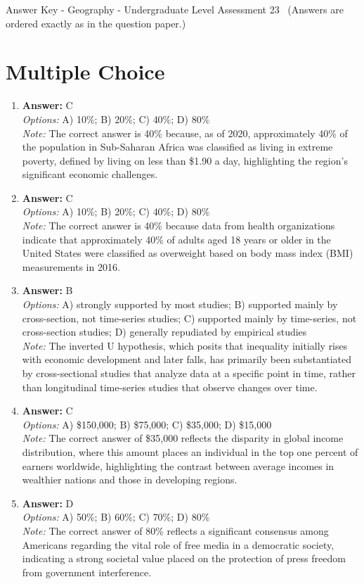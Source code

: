 \documentclass[12pt]{article}
\begin{document}
\begin{center}
Answer Key - Geography - Undergraduate Level Assessment 23 \
\small (Answers are ordered exactly as in the question paper.)
\end{center}

\section*{Multiple Choice}
\begin{enumerate}[label=\arabic*.]
\item \textbf{Answer:} C
\\ \textit{Options:} A) 10\%; B) 20\%; C) 40\%; D) 80\%
\\ \textit{Note:} The correct answer is 40\% because, as of 2020, approximately 40\% of the population in Sub-Saharan Africa was classified as living in extreme poverty, defined by living on less than \$1.90 a day, highlighting the region's significant economic challenges.
\item \textbf{Answer:} C
\\ \textit{Options:} A) 10\%; B) 20\%; C) 40\%; D) 80\%
\\ \textit{Note:} The correct answer is 40\% because data from health organizations indicate that approximately 40\% of adults aged 18 years or older in the United States were classified as overweight based on body mass index (BMI) measurements in 2016.
\item \textbf{Answer:} B
\\ \textit{Options:} A) strongly supported by most studies; B) supported mainly by cross-section, not time-series studies; C) supported mainly by time-series, not cross-section studies; D) generally repudiated by empirical studies
\\ \textit{Note:} The inverted U hypothesis, which posits that inequality initially rises with economic development and later falls, has primarily been substantiated by cross-sectional studies that analyze data at a specific point in time, rather than longitudinal time-series studies that observe changes over time.
\item \textbf{Answer:} C
\\ \textit{Options:} A) \$150,000; B) \$75,000; C) \$35,000; D) \$15,000
\\ \textit{Note:} The correct answer of \$35,000 reflects the disparity in global income distribution, where this amount places an individual in the top one percent of earners worldwide, highlighting the contrast between average incomes in wealthier nations and those in developing regions.
\item \textbf{Answer:} D
\\ \textit{Options:} A) 50\%; B) 60\%; C) 70\%; D) 80\%
\\ \textit{Note:} The correct answer of 80\% reflects a significant consensus among Americans regarding the vital role of free media in a democratic society, indicating a strong societal value placed on the protection of press freedom from government interference.
\end{enumerate}
\end{document}
